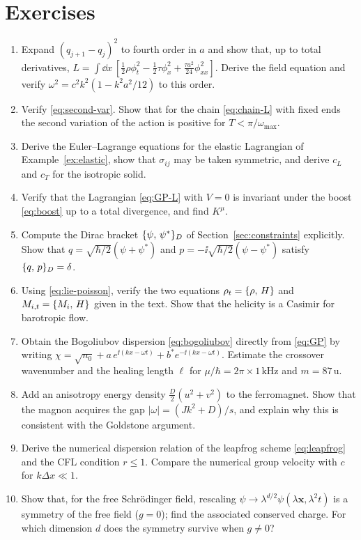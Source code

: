 \section*{Exercises}

\begin{enumerate}
\item\label{ex:chain} Expand $(q_{j+1}-q_j)^2$ to fourth order in $a$ and show that, up to total derivatives,
$L=\int\dd x\,[\tfrac12\rho\phi_t^2-\tfrac12\tau\phi_x^2+\tfrac{\tau a^2}{24}\phi_{xx}^2]$.
Derive the field equation and verify $\omega^2=c^2k^2(1-k^2a^2/12)$ to this order.

\item Verify \eqref{eq:second-var}. Show that for the chain \eqref{eq:chain-L} with fixed ends the
second variation of the action is positive for $T<\pi/\omega_{\max}$.

\item Derive the Euler--Lagrange equations for the elastic Lagrangian of Example~\ref{ex:elastic}, show that $\sigma_{ij}$
may be taken symmetric, and derive $c_L$ and $c_T$ for the isotropic solid.

\item Verify that the Lagrangian \eqref{eq:GP-L} with $V=0$ is invariant under the boost \eqref{eq:boost}
up to a total divergence, and find $K^\mu$.

\item Compute the Dirac bracket $\{\psi,\,\psi^*\}_D$ of Section~\ref{sec:constraints} explicitly. Show that
$q=\sqrt{\hbar/2}(\psi+\psi^*)$ and $p=-\ii\sqrt{\hbar/2}(\psi-\psi^*)$ satisfy $\{q,\,p\}_D=\delta$.

\item\label{ex:lp} Using \eqref{eq:lie-poisson}, verify the two equations $\rho_t=\{\rho,\,H\}$ and
$M_{i,t}=\{M_i,\,H\}$ given in the text. Show that the helicity is a Casimir for barotropic flow.

\item Obtain the Bogoliubov dispersion \eqref{eq:bogoliubov} directly from \eqref{eq:GP}
by writing $\chi=\sqrt{n_0}+a\,e^{\ii(kx-\omega t)}+b^*e^{-\ii(kx-\omega t)}$. Estimate the crossover
wavenumber and the healing length $\ell$ for $\mu/\hbar=2\pi\times1\,$kHz and $m=87\,$u.

\item\label{ex:gap} Add an anisotropy energy density $\tfrac{D}{2}(u^2+v^2)$ to the ferromagnet. Show that the
magnon acquires the gap $|\omega|=(Jk^2+D)/s$, and explain why this is consistent with the Goldstone argument.

\item Derive the numerical dispersion relation of the leapfrog scheme \eqref{eq:leapfrog} and the
CFL condition $r\le1$. Compare the numerical group velocity with $c$ for $k\Delta x\ll1$.

\item Show that, for the free Schr\"odinger field, rescaling $\psi\to\lambda^{d/2}\psi(\lambda\mathbf{x},\lambda^2t)$
is a symmetry of the free field ($g=0$); find the associated conserved
charge. For which dimension $d$ does the symmetry survive when $g\neq0$?
\end{enumerate}

